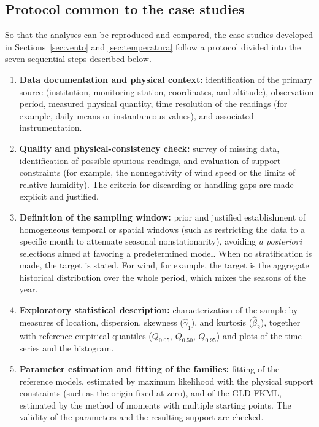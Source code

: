 \subsection{Protocol common to the case studies}\label{subsec:protocolo}

So that the analyses can be reproduced and compared, the case studies developed in Sections~\ref{sec:vento} and \ref{sec:temperatura} follow a protocol divided into the seven sequential steps described below.

\begin{enumerate}
    \item \textbf{Data documentation and physical context:} identification of the primary source (institution, monitoring station, coordinates, and altitude), observation period, measured physical quantity, time resolution of the readings (for example, daily means or instantaneous values), and associated instrumentation.

    \item \textbf{Quality and physical-consistency check:} survey of missing data, identification of possible spurious readings, and evaluation of support constraints (for example, the nonnegativity of wind speed or the limits of relative humidity). The criteria for discarding or handling gaps are made explicit and justified.

    \item \textbf{Definition of the sampling window:} prior and justified establishment of homogeneous temporal or spatial windows (such as restricting the data to a specific month to attenuate seasonal nonstationarity), avoiding \textit{a posteriori} selections aimed at favoring a predetermined model. When no stratification is made, the target is stated. For wind, for example, the target is the aggregate historical distribution over the whole period, which mixes the seasons of the year.

    \item \textbf{Exploratory statistical description:} characterization of the sample by measures of location, dispersion, skewness ($\widehat\gamma_1$), and kurtosis ($\widehat\beta_2$), together with reference empirical quantiles ($Q_{0.05}$, $Q_{0.50}$, $Q_{0.95}$) and plots of the time series and the histogram.

    \item \textbf{Parameter estimation and fitting of the families:} fitting of the reference models, estimated by maximum likelihood with the physical support constraints (such as the origin fixed at zero), and of the GLD-FKML, estimated by the method of moments with multiple starting points. The validity of the parameters and the resulting support are checked.


\end{enumerate}
